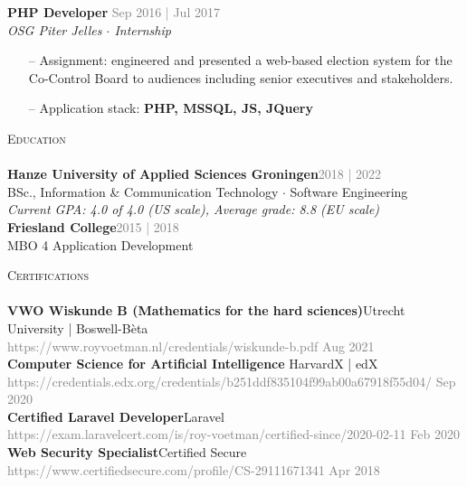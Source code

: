 \documentclass[a4paper]{article}
\newcommand{\lineunder} {
    \vspace*{-8pt} \\
    \hspace*{-18pt} \hrulefill \\
}
\newcommand{\header} [1] {
    {\hspace*{-18pt}\vspace*{6pt} \textsc{#1}}
    \vspace*{-6pt} \lineunder
}
\begin{document}
\textbf{PHP Developer} \hfill \textcolor{gray}{Sep 2016 | Jul 2017}\\
\textit{OSG Piter Jelles $\cdot$ Internship}\\
\vspace{-1mm}
\begin{itemize} \itemsep 1pt
	\item[--] Assignment: engineered and presented a web-based election system for the Co-Control Board to audiences including senior executives and stakeholders.
	\item[--] Application stack: \textbf{PHP, MSSQL, JS, JQuery}
\end{itemize}


\vspace{5mm}

\header{Education}
\vspace{2mm}
\textbf{Hanze University of Applied Sciences Groningen}\hfill \textcolor{gray}{2018 | 2022}\\
BSc., Information \& Communication Technology $\cdot$ Software Engineering\\
\vspace{1mm}
\emph{Current GPA: 4.0 of 4.0 (US scale), Average grade: 8.8 (EU scale)}\\
\vspace{1mm}
\vspace{3mm}
\textbf{Friesland College}\hfill \textcolor{gray}{2015 | 2018}\\
MBO 4 Application Development\\

\newpage

\header{Certifications}
\textbf{VWO Wiskunde B (Mathematics for the hard sciences)}\hfill Utrecht University | Boswell-Bèta\\
 \textcolor{gray}{https://www.royvoetman.nl/credentials/wiskunde-b.pdf}
 \hfill \textcolor{gray}{Aug 2021}\\
\vspace{2mm}
\textbf{Computer Science for Artificial Intelligence }\hfill HarvardX | edX\\
\textcolor{gray}{https://credentials.edx.org/credentials/b251ddf835104f99ab00a67918f55d04/} \hfill \textcolor{gray}{Sep 2020}\\
\vspace{2mm}
\textbf{Certified Laravel Developer}\hfill Laravel\\
\textcolor{gray}{https://exam.laravelcert.com/is/roy-voetman/certified-since/2020-02-11} \hfill \textcolor{gray}{Feb 2020}\\
\vspace{2mm}
\textbf{Web Security Specialist}\hfill Certified Secure\\
\textcolor{gray}{https://www.certifiedsecure.com/profile/CS-29111671341} \hfill \textcolor{gray}{Apr 2018}\\
\vspace{2mm}
\end{document}
